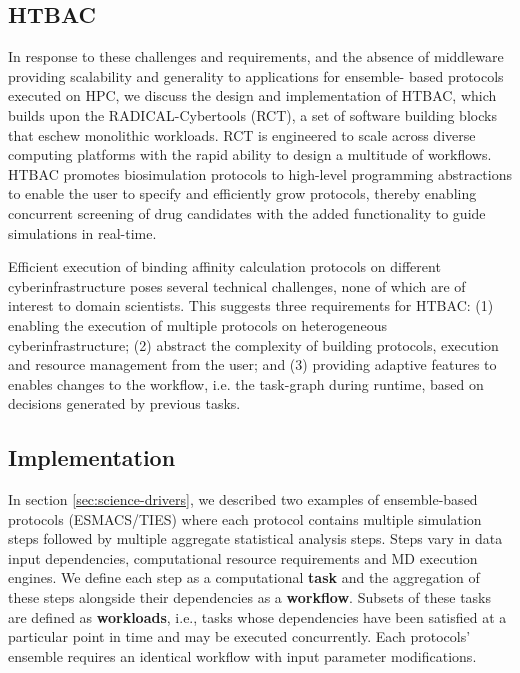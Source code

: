 \subsection{HTBAC}

In response to these challenges and requirements, and the absence of
middleware providing scalability and generality to applications for ensemble-
based protocols executed on HPC, we discuss the design and implementation of
HTBAC, which builds upon the RADICAL-Cybertools (RCT), a set of software
building blocks that eschew monolithic workloads. RCT is engineered to scale
across diverse computing platforms with the rapid ability to design a
multitude of workflows. HTBAC promotes biosimulation protocols to high-level
programming abstractions to enable the user to specify and efficiently grow
protocols, thereby enabling concurrent screening of drug candidates with the
added functionality to guide simulations in real-time.


Efficient execution of binding affinity calculation protocols on different
cyberinfrastructure poses several technical challenges, none of which are of
interest to domain scientists.  This
suggests three requirements for HTBAC\@: (1) enabling the execution of
multiple protocols on heterogeneous cyberinfrastructure; (2) abstract the
complexity of building protocols, execution and resource management from the
user; and (3) providing adaptive features to enables changes to the workflow,
i.e. the task-graph during runtime, based on decisions generated by previous
tasks.


\subsection{Implementation}

In section \ref{sec:science-drivers}, we described two examples of ensemble-based protocols (ESMACS/TIES)
where each protocol contains multiple simulation steps followed by multiple 
aggregate statistical analysis steps. Steps vary in data input dependencies, 
computational resource requirements and MD execution engines. We define 
each step as a computational \textbf{task} and the aggregation of these 
steps alongside their dependencies as a \textbf{workflow}. Subsets of 
these tasks are defined as \textbf{workloads}, i.e., tasks whose dependencies 
have been satisfied at a particular point in time and may be executed 
concurrently. Each protocols' ensemble requires an identical workflow 
with input parameter modifications.

